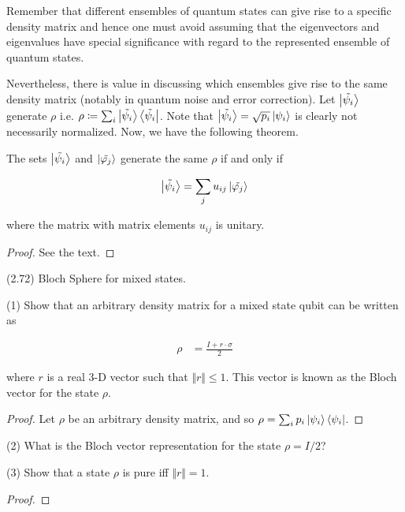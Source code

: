 \documentclass[main.tex]{subfiles}
\begin{document}
\begin{subappendices}
Remember that different ensembles of quantum states can give rise to a specific density matrix and hence one must avoid assuming that the eigenvectors and eigenvalues have special significance with regard to the represented ensemble of quantum states.

Nevertheless, there is value in discussing which ensembles give rise to the same density matrix (notably in quantum noise and error correction). Let $\ket{\tilde{\psi_i}}$ generate $\rho$ i.e. $\rho\coloneqq\sum_i\ket{\tilde{\psi_i}}\bra{\tilde{\psi_i}}$. Note that $\ket{\tilde{\psi_i}} = \sqrt{p_i}\ket{\psi_i}$ is clearly not necessarily normalized. Now, we have the following theorem.

\begin{theorem}
The sets $\ket{\tilde{\psi_i}}$ and $\ket{\tilde{\varphi_j}}$ generate the same $\rho$ if and only if

\begin{align*}
	\ket{\tilde{\psi_i}} = \sum_j u_{ij}\ket{\tilde{\varphi_j}}
\end{align*}

where the matrix with matrix elements $u_{ij}$ is unitary.
\begin{proof}
	See the text.
\end{proof}
\end{theorem}

\begin{exercise}
(2.72) Bloch Sphere for mixed states.

(1) Show that an arbitrary density matrix for a mixed state qubit can be written as

\begin{align*}
	\rho &= \frac{I + r \cdot \sigma}{2}
\end{align*}

where $r$ is a real 3-D vector such that $\Vert r \Vert \leq 1$. This vector is known as the Bloch vector for the state $\rho$. 

\begin{proof}
Let $\rho$ be an arbitrary density matrix, and so $\rho = \sum_i p_i \ket{\psi_i}\bra{\psi_i}$. 
\end{proof}	

(2) What is the Bloch vector representation for the state $\rho = I/2$?

(3) Show that a state $\rho$ is pure iff $\Vert r \Vert = 1$. 

\begin{proof}
	
\end{proof}


\end{exercise}
\end{subappendices}
\end{document}
